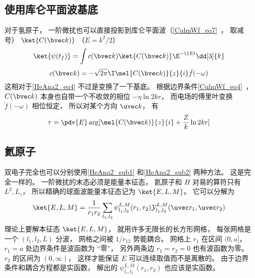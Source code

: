 \subsection{使用库仑平面波基底}\label{HeAna2_sub2}
对于氢原子， 一阶微扰也可以直接投影到库仑平面波（\autoref{CulmWf_eq7}~， 取减号） $\ket{C(\bvec k)}$ （$E = k^2/2$）
\begin{equation}
\ket{\psi(t_f)} = \int c(\bvec k)\ket{C(\bvec k)} \E^{-\I E t} \dd[3]{k}
\end{equation}
\begin{equation}
c(\bvec k) = -\sqrt{2\pi}\I\mel{C(\bvec k)}{z}{i} \tilde f(-\omega)
\end{equation}
这相对于\autoref{HeAna2_eq4} 不过是变换了一下基底。 根据边界条件\autoref{CulmWf_eq4}~， $C(\bvec k)$ 本身也自带一个不收敛的相位 $-\eta \ln 2kr$， 而电场的傅里叶变换 $\tilde f(-\omega)$ 相位恒定， 所以对某个方向 $\uvec k$， 有
\begin{equation}
\tau = \pdv{E} \arg[\mel{C(\bvec k)}{z}{i} + \frac{Z}{k}\ln 2kr]
\end{equation}


\subsection{氦原子}
双电子完全也可以分别使用\autoref{HeAna2_sub1} 和\autoref{HeAna2_sub2} 两种方法。 这是完全一样的。 一阶微扰的末态必须是能量本征态， 氦原子和 $H$ 对易的算符只有 $L^2, L_z$， 所以精确的球面波能量本征态记为 $\ket{E,L,M}$。 它可以分解为
\begin{equation}
\ket{E,L,M} = \frac{1}{r_1r_2}\sum_{l_1,l_2}\psi_{l_1,l_2}^{L, M}(r_1, r_2)\mathcal Y_{l_1,l_2}^{L, M}(\uvec r_1, \uvec r_2)
\end{equation}
理论上要解本征态 $\ket{E,L,M}$， 就用许多无限长的长方形网格， 每张网格是一个 $(l_1,l_2,L)$ 分波， 网格之间被 $1/r_{12}$ 势能耦合。 网格上 $r_1$ 在区间 $(0,a]$， $r_1 = a$ 处边界条件是波函数为 “零”， 另外两条边 $r_1 = r_2 = 0$ 也有波函数为零。 $r_2$ 的区间为 $(0,\infty)$， 这样才能保证 $E$ 可以连续取值而不是离散的。 由于边界条件和耦合方程都是实函数， 解出的 $\psi_{l_1,l_2}^{L, M}(r_1, r_2)$ 也应该是实函数。

